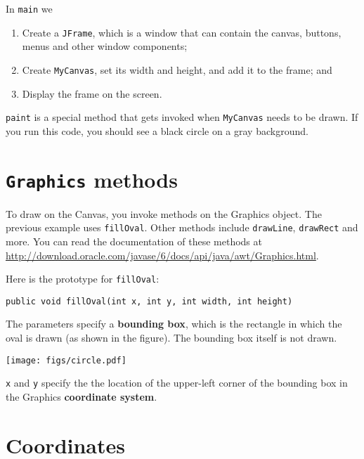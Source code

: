 \documentclass[12pt]{book}
\theoremstyle{definition}
\begin{document}
In {\tt main} we 

\begin{enumerate}

\item Create a {\tt JFrame}, which is a window that can contain the
  canvas, buttons, menus and other window components;

\item Create {\tt MyCanvas}, set its width and height, and add it
  to the frame; and

\item Display the frame on the screen.

\end{enumerate}

{\tt paint} is a special method that gets invoked
when {\tt MyCanvas} needs to be drawn.
If you run this code, you should see a black circle on a gray
background.


\section{{\tt Graphics} methods}

To draw on the Canvas, you invoke methods on the
Graphics object.  The previous example uses {\tt fillOval}.
Other methods include {\tt drawLine}, {\tt drawRect} and more.
You can read the documentation of these methods at
\url{http://download.oracle.com/javase/6/docs/api/java/awt/Graphics.html}.

Here is the prototype for {\tt fillOval}:

\begin{verbatim}
public void fillOval(int x, int y, int width, int height)
\end{verbatim}

The parameters specify 
a {\bf bounding box}, which is the rectangle
in which the oval is drawn (as shown in the figure).  The
bounding box itself is not drawn.



\texttt{[image: figs/circle.pdf]}

{\tt x} and {\tt y} specify the
the location of the upper-left corner 
of the bounding box in the Graphics
{\bf coordinate system}.


\section{Coordinates}
\end{document}
